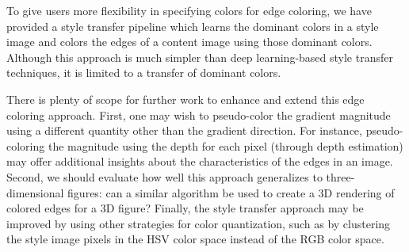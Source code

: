 \documentclass{article}
\begin{document}
To give users more flexibility in specifying colors for edge coloring, we have provided a style transfer pipeline which learns the dominant colors in a style image and colors the edges of a content image using those dominant colors. Although this approach is much simpler than deep learning-based style transfer techniques, it is limited to a transfer of dominant colors.

There is plenty of scope for further work to enhance and extend this edge coloring approach. First, one may wish to pseudo-color the gradient magnitude using a different quantity other than the gradient direction. For instance, pseudo-coloring the magnitude using the depth for each pixel (through depth estimation) may offer additional insights about the characteristics of the edges in an image. Second, we should evaluate how well this approach generalizes to three-dimensional figures: can a similar algorithm be used to create a 3D rendering of colored edges for a 3D figure? Finally, the style transfer approach may be improved by using other strategies for color quantization, such as by clustering the style image pixels in the HSV color space instead of the RGB color space.



\end{document}
